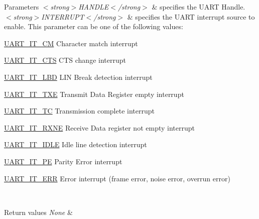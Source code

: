 \begin{DoxyParams}{Parameters}
{\em $<$strong$>$\+H\+A\+N\+D\+L\+E$<$/strong$>$} & specifies the U\+A\+RT Handle. \\
\hline
{\em $<$strong$>$\+I\+N\+T\+E\+R\+R\+U\+P\+T$<$/strong$>$} & specifies the U\+A\+RT interrupt source to enable. This parameter can be one of the following values\+: \begin{DoxyItemize}
\item \mbox{\hyperlink{group___u_a_r_t___interrupt__definition_ga4c22e866bce68975a180828012489106}{U\+A\+R\+T\+\_\+\+I\+T\+\_\+\+CM}} Character match interrupt \item \mbox{\hyperlink{group___u_a_r_t___interrupt__definition_ga986d271478550f9afa918262ca642333}{U\+A\+R\+T\+\_\+\+I\+T\+\_\+\+C\+TS}} C\+TS change interrupt \item \mbox{\hyperlink{group___u_a_r_t___interrupt__definition_gabca5e77508dc2dd9aa26fcb683d9b988}{U\+A\+R\+T\+\_\+\+I\+T\+\_\+\+L\+BD}} L\+IN Break detection interrupt \item \mbox{\hyperlink{group___u_a_r_t___interrupt__definition_ga552636e2af516d578856f5ee2ba71ed7}{U\+A\+R\+T\+\_\+\+I\+T\+\_\+\+T\+XE}} Transmit Data Register empty interrupt \item \mbox{\hyperlink{group___u_a_r_t___interrupt__definition_gab9a4dc4e8cea354fd60f4117513b2004}{U\+A\+R\+T\+\_\+\+I\+T\+\_\+\+TC}} Transmission complete interrupt \item \mbox{\hyperlink{group___u_a_r_t___interrupt__definition_gac1bedf7a65eb8c3f3c4b52bdb24b139d}{U\+A\+R\+T\+\_\+\+I\+T\+\_\+\+R\+X\+NE}} Receive Data register not empty interrupt \item \mbox{\hyperlink{group___u_a_r_t___interrupt__definition_ga9781808d4f9999061fc2da36572191d9}{U\+A\+R\+T\+\_\+\+I\+T\+\_\+\+I\+D\+LE}} Idle line detection interrupt \item \mbox{\hyperlink{group___u_a_r_t___interrupt__definition_ga55f922ddcf513509710ade5d7c40a1db}{U\+A\+R\+T\+\_\+\+I\+T\+\_\+\+PE}} Parity Error interrupt \item \mbox{\hyperlink{group___u_a_r_t___interrupt__definition_ga8eb26d8edd9bf78ae8d3ad87dd51b618}{U\+A\+R\+T\+\_\+\+I\+T\+\_\+\+E\+RR}} Error interrupt (frame error, noise error, overrun error) \end{DoxyItemize}
\\
\hline
\end{DoxyParams}

\begin{DoxyRetVals}{Return values}
{\em None} & \\
\hline
\end{DoxyRetVals}
\mbox{\label{group___u_a_r_t___exported___macros_gafc4f20cb0f29ba146c9bc14167c52744}} 
